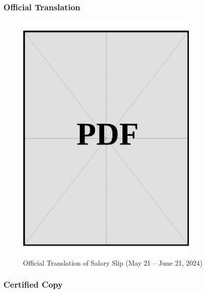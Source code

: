 \subsubsection*{Official Translation}
\vspace*{\fill}
\begin{figure}[h]
    \centering
    \includegraphics[page=1, width=0.8\textwidth]{../application-docs/applicant/funds/salary-slips/month-1/official-translations.pdf}
    \caption{Official Translation of Salary Slip (May 21 – June 21, 2024)}
    \label{fig:month-1-trans}
\end{figure}
\vspace*{\fill}

\clearpage

\subsubsection*{Certified Copy}
\vspace*{\fill}

